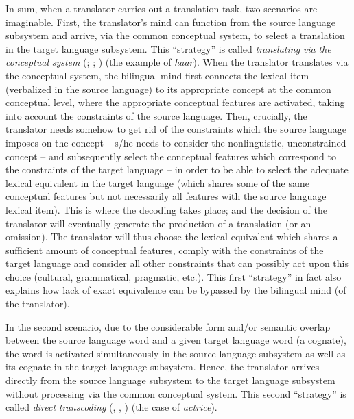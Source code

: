 In sum, when a translator carries out a translation task, two scenarios are imaginable. First, the translator’s mind can function from the source language subsystem and arrive, via the common conceptual system, to select a translation in the target language subsystem. This ``strategy'' is called \textit{translating} \textit{via} \textit{the} \textit{conceptual} \textit{system} (\citealt[54--55]{house_towards_2013}; \citeyear{house_translation_2015}; \citeyear[119--20]{house_translation_2016}) (the example of \textit{haar}). When the translator translates via the conceptual system, the bilingual mind first connects the lexical item (verbalized in the source language) to its appropriate concept at the common conceptual level, where the appropriate conceptual features are activated, taking into account the constraints of the source language. Then, crucially, the translator needs somehow to get rid of the constraints which the source language imposes on the concept – s/he needs to consider the nonlinguistic, unconstrained concept – and subsequently select the conceptual features which correspond to the constraints of the target language – in order to be able to select the adequate lexical equivalent in the target language (which shares some of the same conceptual features but not necessarily all features with the source language lexical item). This is where the decoding takes place; and the decision of the translator will eventually generate the production of a translation (or an omission). The translator will thus choose the lexical equivalent which shares a sufficient amount of conceptual features, comply with the constraints of the target language and consider all other constraints that can possibly act upon this choice (cultural, grammatical, pragmatic, etc.). This first ``strategy'' in fact also explains how lack of exact equivalence can be bypassed by the bilingual mind (of the translator).

In the second scenario, due to the considerable form and/or semantic overlap between the source language word and a given target language word (a cognate), the word is activated simultaneously in the source language subsystem as well as its cognate in the target language subsystem. Hence, the translator arrives directly from the source language subsystem to the target language subsystem without processing via the common conceptual system. This second ``strategy'' is called \textit{direct} \textit{transcoding} (\citealt[54--55]{house_towards_2013}, \citeyear{house_translation_2015}, \citeyear[119--120]{house_translation_2016}) (the case of \textit{actrice}).

